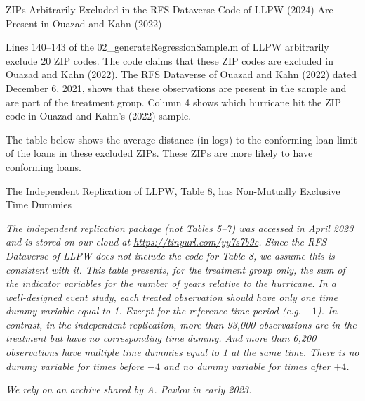 \documentclass{article}
\begin{document}
\clearpage
\pagebreak

\begin{table}
    
\caption{ZIPs Arbitrarily Excluded in the RFS Dataverse Code of LLPW (2024) Are Present in Ouazad and Kahn (2022)} 

Lines 140--143 of the 02\_generateRegressionSample.m of LLPW arbitrarily exclude 20 ZIP codes. The code claims that these ZIP codes are excluded in Ouazad and Kahn (2022). The RFS Dataverse of Ouazad and Kahn (2022) dated December 6, 2021, shows that these observations are present in the sample and are part of the treatment group. Column 4 shows which hurricane hit the ZIP code in Ouazad and Kahn's (2022) sample.

\bigskip

\begin{center}
    
\end{center}

\bigskip

The table below shows the average distance (in logs) to the conforming loan limit of the loans in these excluded ZIPs. These ZIPs are more likely to have conforming loans.

\bigskip

\begin{center}
    
\end{center}

\end{table}

\clearpage
\pagebreak

\begin{table}
\caption{The Independent Replication of LLPW, Table 8, has Non-Mutually Exclusive Time Dummies}

\emph{The independent replication package (not Tables 5--7) was accessed in April 2023 and is stored on our cloud at \url{https://tinyurl.com/yy7s7b9c}. Since the RFS Dataverse of LLPW does not include the code for Table 8, we assume this is consistent with it. This table presents, for the treatment group only, the sum of the indicator variables for the number of years relative to the hurricane. In a well-designed event study, each treated observation should have only one time dummy variable equal to 1. Except for the reference time period (e.g. $-1$). In contrast, in the independent replication, more than 93,000 observations are in the treatment but have no corresponding time dummy. And more than 6,200 observations have multiple time dummies equal to 1 at the same time. There is no dummy variable for times before $-4$ and no dummy variable for times after $+4$. }

\begin{center}

\end{center}

\emph{We rely on an archive shared by A. Pavlov in early 2023.}

\end{table}
\end{document}

